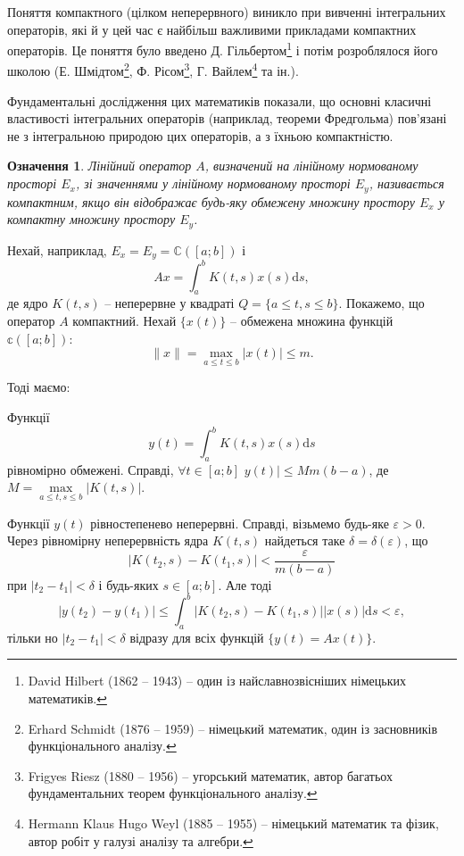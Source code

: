 \documentclass[14pt,twoside]{extreport}
\theoremstyle{mystyle}
\newtheorem{dfn}{Означення}
\numberwithin{equation}{chapter}
\newcommand{\cab}{\mathbb{C}([a; b])}
\begin{document}
Поняття компактного (цілком неперервного) виникло при вивченні інтегральних операторів, які й у цей час є найбільш важливими прикладами компактних операторів. Це поняття було введено Д. Гільбертом\footnote{David Hilbert (1862 -- 1943) -- один із найславнозвісніших німецьких математиків.} і потім розроблялося його школою (Е. Шмідтом\footnote{Erhard Schmidt (1876 -- 1959) -- німецький математик, один із засновників функціонального аналізу.}, Ф. Рісом\footnote{Frigyes Riesz (1880 -- 1956) -- угорський математик, автор багатьох фундаментальних теорем функціонального аналізу.}, Г. Вайлем\footnote{Hermann Klaus Hugo Weyl (1885 -- 1955) -- німецький математик та фізик, автор робіт у галузі аналізу та алгебри.} та ін.).

Фундаментальні дослідження цих математиків показали, що основні класичні властивості інтегральних операторів (наприклад, теореми Фредгольма) пов'язані не з інтегральною природою цих операторів, а з їхньою компактністю.

\begin{dfn}
	Лінійний оператор $A$, визначений на лінійному нормованому просторі $E_x$, зі значеннями у лінійному нормованому просторі $E_y$, називається компактним, якщо він відображає будь-яку обмежену множину простору $E_x$ у компактну множину простору $E_y$.
\end{dfn}
Нехай, наприклад, $E_x = E_y = \cab$ і
\[
Ax = \int_{a}^{b} K(t, s) x(s) \mathrm{d}s,
\]
де ядро $K(t, s)$ -- неперервне у квадраті $Q=\{a \leqslant t, s \leqslant b\}$. Покажемо, що оператор $A$ компактний. Нехай $\{x(t)\}$ -- обмежена множина функцій $\mathbb{c}([a; b])$:
\[
\|x\|=\max\limits_{a\leqslant t \leqslant b} |x(t)| \leqslant m.
\]

Тоді маємо:

Функції
\[
y(t) = \int_{a}^{b} K(t, s) x(s) \mathrm{d}s
\]
рівномірно обмежені. Справді, $\forall t \in [a; b]$ $y(t)| \leqslant Mm(b-a)$, де $M = \max\limits_{a\leqslant t, s \leqslant b} |K(t, s)|$.

Функції $y(t)$ рівностепенево неперервні. Справді, візьмемо будь-яке $\varepsilon > 0$. Через рівномірну неперервність ядра $K(t, s)$ найдеться таке $\delta = \delta (\varepsilon)$, що
\[
|K(t_2, s) - K(t_1, s)| < \dfrac{\varepsilon}{m(b-a)}
\]
при $|t_2 - t_1|<\delta$ і будь-яких $s \in [a; b]$. Але тоді
\[
|y(t_2) - y(t_1)| \leqslant \int_{a}^{b} |K(t_2, s) - K(t_1, s)| | x(s)| \mathrm{d}s < \varepsilon,
\]
тільки но $|t_2 - t_1| < \delta$ відразу для всіх функцій $\{y(t)=Ax(t)\}$.
\end{document}
